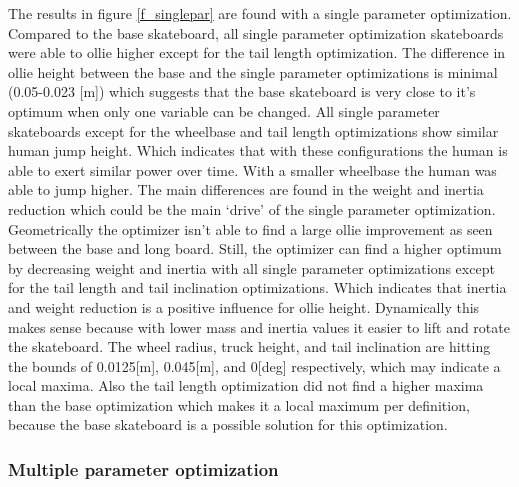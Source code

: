 \documentclass[default,iicol]{sn-jnl}
\begin{document}
\noindent The results in figure \ref{f_singlepar} are found with a single parameter optimization. Compared to the base skateboard, all single parameter optimization skateboards were able to ollie higher except for the tail length optimization. The difference in ollie height between the base and the single parameter optimizations is minimal (0.05-0.023 [m]) which suggests that the base skateboard is very close to it's optimum when only one variable can be changed. All single parameter skateboards except for the wheelbase and tail length optimizations show similar human jump height. Which indicates that with these configurations the human is able to exert similar power over time. With a smaller wheelbase the human was able to jump higher. The main differences are found in the weight and inertia reduction which could be the main `drive' of the single parameter optimization. Geometrically the optimizer isn't able to find a large ollie improvement as seen between the base and long board. Still, the optimizer can find a higher optimum by decreasing weight and inertia with all single parameter optimizations except for the tail length and tail inclination optimizations. Which indicates that inertia and weight reduction is a positive influence for ollie height. Dynamically this makes sense because with lower mass and inertia values it easier to lift and rotate the skateboard. The wheel radius, truck height, and tail inclination are hitting the bounds of 0.0125[m], 0.045[m], and 0[deg] respectively, which may indicate a local maxima. Also the tail length optimization did not find a higher maxima than the base optimization which makes it a local maximum per definition, because the base skateboard is a possible solution for this optimization.

\subsubsection{Multiple parameter optimization}
\end{document}
